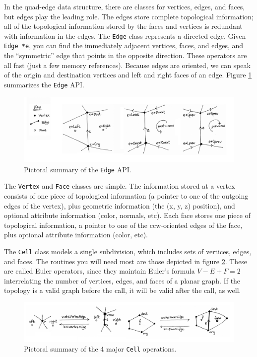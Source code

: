 In the quad-edge data structure, there are classes for vertices, edges, and
faces, but edges play the leading role. The edges store complete topological
information; all of the topological information stored by the faces and vertices
is redundant with information in the edges. The \texttt{Edge} class represents a
directed edge. Given \texttt{Edge *e}, you can find the immediately adjacent
vertices, faces, and edges, and the ``symmetric'' edge that points in the
opposite direction. These operators are all fast (just a few memory references).
Because edges are oriented, we can speak of the origin and destination vertices
and left and right faces of an edge. Figure \ref{fig:quadedge-edge-api}
summarizes the \texttt{Edge} API.

\begin{figure}[h]
	\centering
	\includegraphics[width=\textwidth]{figures/quadedge-edge-api} 
	\caption{Pictoral summary of the \texttt{Edge} API.}
	\label{fig:quadedge-edge-api} 
\end{figure}

The \texttt{Vertex} and \texttt{Face} classes are simple. The information stored
at a vertex consists of one piece of topological information (a pointer to one
of the outgoing edges of the vertex), plus geometric information (the (x, y, z)
position), and optional attribute information (color, normals, etc). Each face
stores one piece of topological information, a pointer to one of the
ccw-oriented edges of the face, plus optional attribute information (color, etc).

The \texttt{Cell} class models a single subdivision, which includes sets of
vertices, edges, and faces. The routines you will need most are those depicted
in figure \ref{fig:quadedge-cell-api}. These are called Euler operators, since
they maintain Euler's formula $V-E+F=2$ interrelating the number of vertices,
edges, and faces of a planar graph. If the topology is a valid graph before the
call, it will be valid after the call, as well.

\begin{figure}[h]
	\centering
	\includegraphics[width=\textwidth]{figures/quadedge-cell-api} 
	\caption{Pictoral summary of the 4 major \texttt{Cell} operations.}
	\label{fig:quadedge-cell-api} 
\end{figure}

